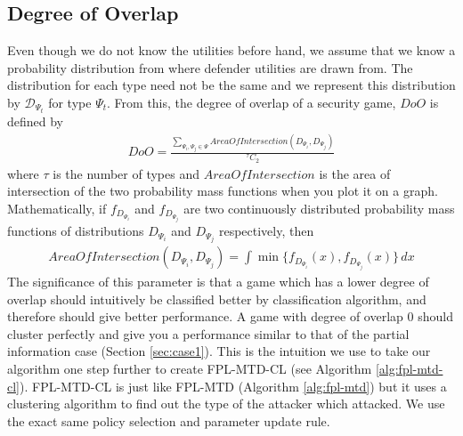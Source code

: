 \documentclass[sigconf]{aamas}  %
\newcommand{\cal}[1]{\mathcal{#1}}
\theoremstyle{definition}
\theoremstyle{definition}
\begin{document}
\subsection{Degree of Overlap}\label{subsec:doo}
Even though we do not know the utilities before hand, we assume that we know a probability distribution from where defender utilities are drawn from. The distribution for each type need not be the same and we represent this distribution by $\cal D_{\Psi_t}$ for type $\Psi_t$. From this, the degree of overlap of a security game, $DoO$ is defined by 
\begin{align*}
    DoO = \frac{\sum_{\Psi_i, \Psi_j \in \Psi}AreaOfIntersection(D_{\Psi_i}, D_{\Psi_j})}{^\tau C_2}
\end{align*}
where $\tau$ is the number of types and $AreaOfIntersection$ is the area of intersection of the two probability mass functions when you plot it on a graph. Mathematically, if $f_{D_{\Psi_i}}$ and $f_{D_{\Psi_j}}$ are two continuously distributed probability mass functions of distributions $D_{\Psi_i}$ and $D_{\Psi_j}$ respectively, then
\begin{align*}
    AreaOfIntersection(D_{\Psi_i}, D_{\Psi_j}) = \int \min\{f_{D_{\Psi_i}}(x), f_{D_{\Psi_j}}(x)\} \,dx
\end{align*}
The significance of this parameter is that a game which has a lower degree of overlap should intuitively be classified better by classification algorithm, and therefore should give better performance. A game with degree of overlap 0 should cluster perfectly and give you a performance similar to that of the partial information case (Section \ref{sec:case1}). This is the intuition we use to take our algorithm one step further to create FPL-MTD-CL (see Algorithm \ref{alg:fpl-mtd-cl}).
FPL-MTD-CL is just like FPL-MTD (Algorithm \ref{alg:fpl-mtd}) but it uses a clustering algorithm to find out the type of the attacker which attacked. We use the exact same policy selection and parameter update rule.
\end{document}
